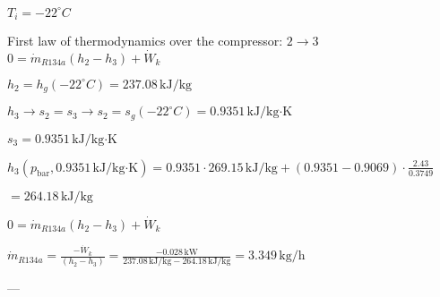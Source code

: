 \( T_i = -22^\circ C \)  

First law of thermodynamics over the compressor: \( 2 \to 3 \)  
\( 0 = \dot{m}_{R134a} (h_2 - h_3) + \dot{W}_k \)  

\( h_2 = h_g (-22^\circ C) = 237.08 \, \text{kJ/kg} \)  

\( h_3 \to s_2 = s_3 \to s_2 = s_g (-22^\circ C) = 0.9351 \, \text{kJ/kg·K} \)  

\( s_3 = 0.9351 \, \text{kJ/kg·K} \)  

\( h_3 (p_{\text{bar}}, 0.9351 \, \text{kJ/kg·K}) = 0.9351 \cdot 269.15 \, \text{kJ/kg} + (0.9351 - 0.9069) \cdot \frac{2.43}{0.3749} \)  

\( = 264.18 \, \text{kJ/kg} \)  

\( 0 = \dot{m}_{R134a} (h_2 - h_3) + \dot{W}_k \)  

\( \dot{m}_{R134a} = \frac{-\dot{W}_k}{(h_2 - h_3)} = \frac{-0.028 \, \text{kW}}{237.08 \, \text{kJ/kg} - 264.18 \, \text{kJ/kg}} = 3.349 \, \text{kg/h} \)  

---